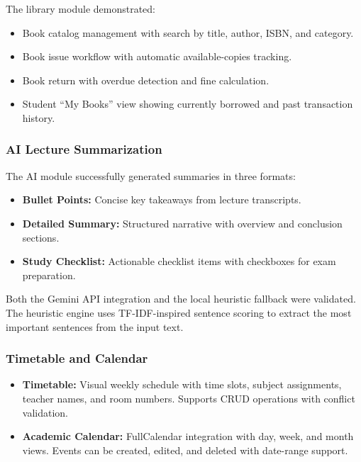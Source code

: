 The library module demonstrated:

\begin{itemize}[leftmargin=2em]
    \item Book catalog management with search by title, author, ISBN, and category.
    \item Book issue workflow with automatic available-copies tracking.
    \item Book return with overdue detection and fine calculation.
    \item Student ``My Books'' view showing currently borrowed and past transaction history.
\end{itemize}

\subsubsection{AI Lecture Summarization}

The AI module successfully generated summaries in three formats:

\begin{itemize}[leftmargin=2em]
    \item \textbf{Bullet Points:} Concise key takeaways from lecture transcripts.
    \item \textbf{Detailed Summary:} Structured narrative with overview and conclusion sections.
    \item \textbf{Study Checklist:} Actionable checklist items with checkboxes for exam preparation.
\end{itemize}

Both the Gemini API integration and the local heuristic fallback were validated. The heuristic engine uses TF-IDF-inspired sentence scoring to extract the most important sentences from the input text.

\subsubsection{Timetable and Calendar}

\begin{itemize}[leftmargin=2em]
    \item \textbf{Timetable:} Visual weekly schedule with time slots, subject assignments, teacher names, and room numbers. Supports CRUD operations with conflict validation.
    \item \textbf{Academic Calendar:} FullCalendar integration with day, week, and month views. Events can be created, edited, and deleted with date-range support.
\end{itemize}

